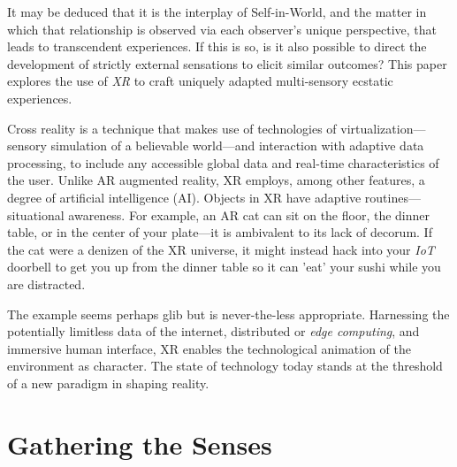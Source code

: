 \documentclass{UIdahoMastersThesis}
\begin{document}
\vspace{9mm}

It may be deduced that it is the interplay of Self-in-World, and the matter in which that relationship is observed via each observer's unique perspective, that leads to transcendent experiences. If this is so, is it also possible to direct the development of strictly external sensations to elicit similar outcomes? This paper explores the use of \textit{\ac{XR}} to craft uniquely adapted multi-sensory ecstatic experiences.

Cross reality is a technique that makes use of technologies of virtualization---sensory simulation of a believable world---and interaction with adaptive data processing, to include any accessible global data and real-time characteristics of the user. Unlike AR augmented reality, XR employs, among other features, a degree of artificial intelligence (AI). Objects in XR have adaptive routines---situational awareness. For example, an AR cat can sit on the floor, the dinner table, or in the center of your plate---it is ambivalent to its lack of decorum. If the cat were a denizen of the \ac{XR} universe, it might instead hack into your \textit{\ac{IoT}} doorbell to get you up from the dinner table so it can 'eat' your sushi while you are distracted.

The example seems perhaps glib but is never-the-less appropriate. Harnessing the potentially limitless data of the internet, distributed or \emph{edge computing}, and immersive human interface, \ac{XR} enables the technological animation of the environment as character. The state of technology today stands at the threshold of a new paradigm in shaping reality.


\section{Gathering the Senses}
\end{document}
